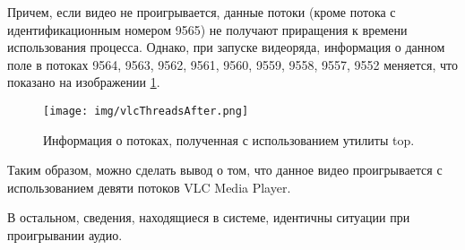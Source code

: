 Причем, если видео не проигрывается, данные потоки (кроме потока с идентификационным номером 9565) не получают приращения к времени использования процесса. Однако, при запуске видеоряда, информация о данном поле в потоках 9564, 9563, 9562, 9561, 9560, 9559, 9558, 9557, 9552 меняется, что показано на изображении \ref{fig:vlcThreadsAfter}.

\begin{figure}[H]
	\centering
	\texttt{[image: img/vlcThreadsAfter.png]}
	\caption{Информация о потоках, полученная с использованием утилиты top. }
	\label{fig:vlcThreadsAfter}
\end{figure}

Таким образом, можно сделать вывод о том, что данное видео проигрывается с использованием девяти потоков VLC Media Player.

В остальном, сведения, находящиеся в системе, идентичны ситуации при проигрывании аудио.
